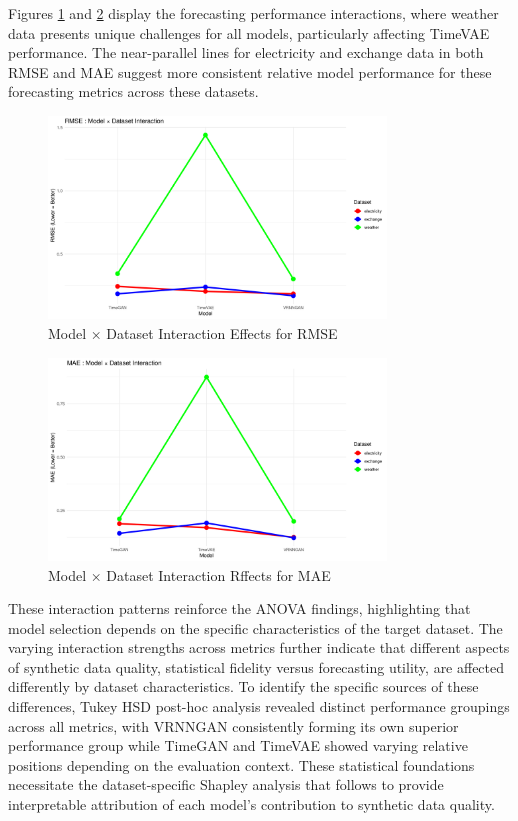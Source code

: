 \documentclass{article}
\begin{document}
Figures \ref{fig:rmse_interaction} and \ref{fig:mae_interaction} display the forecasting performance interactions, where weather data presents unique challenges for all models, particularly affecting TimeVAE performance. The near-parallel lines for electricity and exchange data in both RMSE and MAE suggest more consistent relative model performance for these forecasting metrics across these datasets.

\begin{figure}[H]
\centering
\includegraphics[width=0.8\textwidth]{assets/interaction_rmse.png}
\caption{Model × Dataset Interaction Effects for RMSE}
\label{fig:rmse_interaction}
\end{figure}

\begin{figure}[H]
\centering
\includegraphics[width=0.8\textwidth]{assets/interaction_mae.png}
\caption{Model × Dataset Interaction Rffects for MAE}
\label{fig:mae_interaction}
\end{figure}

These interaction patterns reinforce the ANOVA findings, highlighting that model selection depends on the specific characteristics of the target dataset. The varying interaction strengths across metrics further indicate that different aspects of synthetic data quality, statistical fidelity versus forecasting utility, are affected differently by dataset characteristics. To identify the specific sources of these differences, Tukey HSD post-hoc analysis revealed distinct performance groupings across all metrics, with VRNNGAN consistently forming its own superior performance group while TimeGAN and TimeVAE showed varying relative positions depending on the evaluation context. These statistical foundations necessitate the dataset-specific Shapley analysis that follows to provide interpretable attribution of each model's contribution to synthetic data quality.
\end{document}
